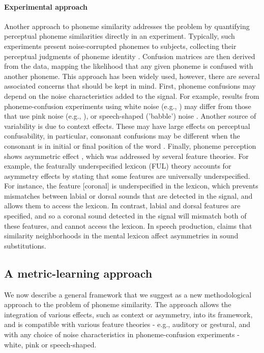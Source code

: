 \paragraph{Experimental approach}
Another approach to phoneme similarity addresses the problem by quantifying perceptual phoneme similarities directly in an experiment. Typically, such experiments present noise-corrupted phonemes to subjects, collecting their perceptual judgments of phoneme identity \citep{NicelyMiller1955}. Confusion matrices are then derived from the data, mapping the likelihood that any given phoneme is confused with another phoneme. This approach has been widely used, however, there are several associated concerns that should be kept in mind. First, phoneme confusions may depend on the noise characteristics added to the signal. For example, results from phoneme-confusion experiments using white noise (e.g., \citealp{NicelyMiller1955, Luce1987}) may differ from those that use pink noise (e.g., \citealp{redford1999relative}), or speech-shaped ('babble') noise \citep{cutler2004patterns}. Another source of variability is due to context effects. These may have large effects on perceptual confusability, in particular, consonant confusions may be different when the consonant is in initial or final position of the word \citep{Luce1987, hura1992role, redford1999relative}. Finally, phoneme perception shows asymmetric effect \citep{kuhl1991human}, which was addressed by several feature theories. For example, the featurally underspecified lexicon (FUL) theory \citep{lahiri2002underspecified, lahiri2010distinctive} accounts for asymmetry effects by stating that some features are universally underspecified. For instance, the feature [coronal] is underspecified in the lexicon, which prevents mismatches between labial or dorsal sounds that are detected in the signal, and allows them to access the lexicon. In contrast, labial and dorsal features are specified, and so a coronal sound detected in the signal will mismatch both of these features, and cannot access the lexicon. In speech production, \citet{Frisch1997} claims that similarity neighborhoods in the mental lexicon affect asymmetries in sound substitutions.

\subsection{A metric-learning approach}
We now describe a general framework that we suggest as a new methodological approach to the problem of phoneme similarity. The approach allows the integration of various effects, such as context or asymmetry, into its framework, and is compatible with various feature theories - e.g., auditory or gestural, and with any choice of noise characteristics in phoneme-confusion experiments - white, pink or speech-shaped.

